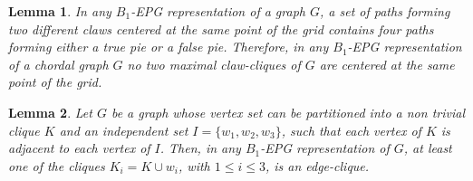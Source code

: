 \documentclass[9pt]{entcs}
\newtheorem{lema}{Lemma}[section]
\newtheorem{defi}{Definition}[section]
\begin{document}
\begin{lema}\label{lem:twoClawNotSameCenterInChordal}
In any $B_1$-EPG representation of a graph $G$, a set of paths forming two different claws centered at the same point of the grid contains four paths forming either a true pie or a false pie. Therefore, in any $B_1$-EPG representation of a chordal graph $G$ no two maximal claw-cliques of $G$ are centered at the same point of the grid.
\end{lema}





\begin{lema}\label{lem:3cliquesNotClaw}
Let $G$ be a graph whose vertex set  can be
partitioned into a non trivial clique $K$ and an independent set $I=\{w_1,w_2,w_3\}$, such that each vertex of $K$ is adjacent to each vertex of $I$. Then, in any $B_1$-EPG representation of $G$, at least one of the cliques  $K_i = K \cup w_i$, with $1 \leq i \leq 3$,  is an edge-clique. 
\end{lema}
\end{document}
